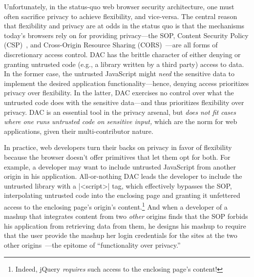 Unfortunately, in the status-quo web browser security architecture,
one must often sacrifice privacy to achieve flexibility, and
vice-versa. The central reason that flexibility and privacy are at
odds in the status quo is that the mechanisms today's browsers rely on
for providing privacy---the SOP, Content Security Policy
(CSP)~\cite{csp}, and Cross-Origin Resource Sharing
(CORS)~\cite{cors13}---are all forms of discretionary access control.
DAC has the brittle character of either denying or granting
untrusted code (e.g., a library written by a third party) access to
data. In the former case, the untrusted JavaScript might {\em need}
the sensitive data to implement the desired application
functionality---hence, denying access prioritizes privacy over
flexibility. In the latter, DAC exercises no control over what the
untrusted code does with the sensitive data---and thus prioritizes
flexibility over privacy. DAC is an essential tool in the privacy
arsenal, but {\em does not fit cases where one runs untrusted code on
  sensitive input,} which are the norm for web applications, given
their multi-contributor nature.

In practice, web developers turn their backs on privacy in favor of
flexibility because the browser doesn't offer primitives that let them
opt for both. For example, a developer may want to include untrusted
JavaScript from another origin in his application. All-or-nothing DAC
leads the developer to include the untrusted library with a
\js|<script>| tag, which effectively bypasses the SOP, interpolating
untrusted code into the enclosing page and granting it unfettered
access to the enclosing page's origin's content.\footnote{Indeed,
  jQuery \emph{requires} such access to the enclosing page's content!}
And when a developer of a mashup that integrates content from two {\em
  other} origins finds that the SOP forbids his application from
retrieving data from them, he designs his mashup to require that the
user provide the mashup her login credentials for the sites at the two
other origins~\cite{mint.com}---the epitome of ``functionality over
privacy.''

%


